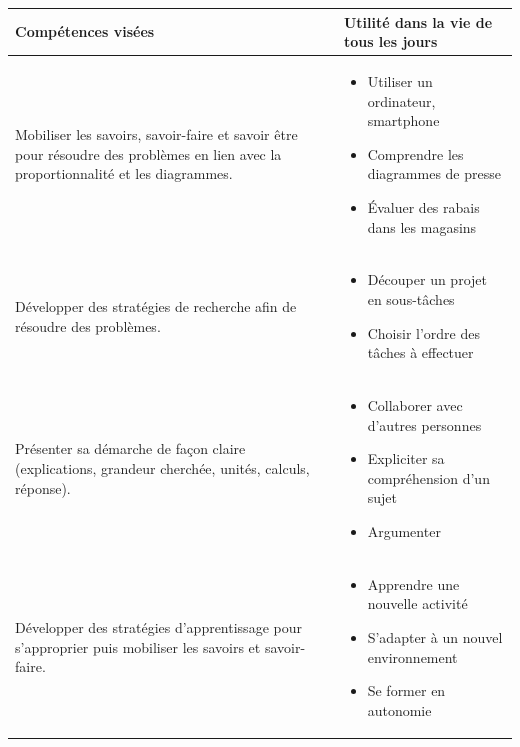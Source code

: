 \def\arraystretch{1.6}
\begin{tabularx}{\textwidth}{|>{\raggedright\arraybackslash}X|>{\raggedright\arraybackslash}X|}
\hline
\cellcolor{themeColor!30}Compétences visées & \cellcolor{themeColor!30}Utilité dans la vie de tous les jours \\
\hline
Mobiliser les savoirs, savoir-faire et savoir être pour résoudre des problèmes en lien avec la proportionnalité et les diagrammes.
&\vspace{-1em}
\begin{itemize}[leftmargin=*, itemsep=2pt, topsep=0pt, partopsep=0pt, parsep=0pt, label=$\triangleright$]
    \item Utiliser un ordinateur, smartphone
    \item Comprendre les diagrammes de presse
    \item Évaluer des rabais dans les magasins
\end{itemize} \\
\hline

Développer des stratégies de recherche afin de résoudre des problèmes.
&\vspace{-1em}
\begin{itemize}[leftmargin=*, itemsep=2pt, topsep=0pt, label=$\triangleright$]
    \item Découper un projet en sous-tâches
    \item Choisir l'ordre des tâches à effectuer
\end{itemize} \\
\hline

Présenter sa démarche de façon claire (explications, grandeur cherchée, unités, calculs, réponse).
&\vspace{-1em}
\begin{itemize}[leftmargin=*, itemsep=2pt, topsep=0pt, label=$\triangleright$]
    \item Collaborer avec d'autres personnes
    \item Expliciter sa compréhension d'un sujet
    \item Argumenter
\end{itemize} \\
\hline

Développer des stratégies d'apprentissage pour s'approprier puis mobiliser les savoirs et savoir-faire.
&\vspace{-1em}
\begin{itemize}[leftmargin=*, itemsep=2pt, topsep=0pt, label=$\triangleright$]
    \item Apprendre une nouvelle activité %
    \item S'adapter à un nouvel environnement %
    \item Se former en autonomie %
\end{itemize} \\
\hline


\end{tabularx}
